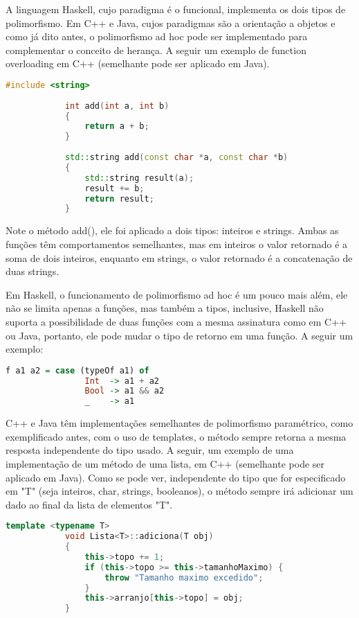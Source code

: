 \documentclass{article}
\begin{document}
        A linguagem Haskell, cujo paradigma é o funcional, implementa os dois tipos de polimorfismo. Em C++ e Java, cujos paradigmas são a orientação a objetos e como já dito antes, o polimorfismo ad hoc pode ser implementado para complementar o conceito de herança. A seguir um exemplo de function overloading em C++ (semelhante pode ser aplicado em Java).
        \begin{lstlisting}[language=C++, frame=single]
            #include <string>
            
            int add(int a, int b) 
            {
                return a + b;
            }
            
            std::string add(const char *a, const char *b)
            {
                std::string result(a);
                result += b;
                return result;
            }
        \end{lstlisting}
        
        Note o método add(), ele foi aplicado a dois tipos: inteiros e strings. Ambas as funções têm comportamentos semelhantes, mas em inteiros o valor retornado é a soma de dois inteiros, enquanto em strings, o valor retornado é a concatenação de duas strings.
        
        Em Haskell, o funcionamento de polimorfismo ad hoc é um pouco mais além, ele não se limita apenas a funções, mas também a tipos, inclusive, Haskell não suporta a possibilidade de duas funções com a mesma assinatura como em C++ ou Java, portanto, ele pode mudar o tipo de retorno em uma função. A seguir um exemplo:
        \begin{lstlisting}[language=Haskell, frame=single]
            f a1 a2 = case (typeOf a1) of
                Int  -> a1 + a2
                Bool -> a1 && a2
                _    -> a1
        \end{lstlisting}
        
        \newpage
        C++ e Java têm implementações semelhantes de polimorfismo paramétrico, como exemplificado antes, com o uso de templates, o método sempre retorna a mesma resposta independente do tipo usado. A seguir, um exemplo de uma implementação de um método de uma lista, em C++ (semelhante pode ser aplicado em Java). Como se pode ver, independente do tipo que for especificado em "T" (seja inteiros, char, strings, booleanos), o método sempre irá adicionar um dado ao final da lista de elementos "T".
        \begin{lstlisting}[language=C++, frame=single]
            template <typename T>
            void Lista<T>::adiciona(T obj)
            {
                this->topo += 1;
                if (this->topo >= this->tamanhoMaximo) {
                    throw "Tamanho maximo excedido";
                }
                this->arranjo[this->topo] = obj;
            }
        \end{lstlisting}
        
\end{document}
